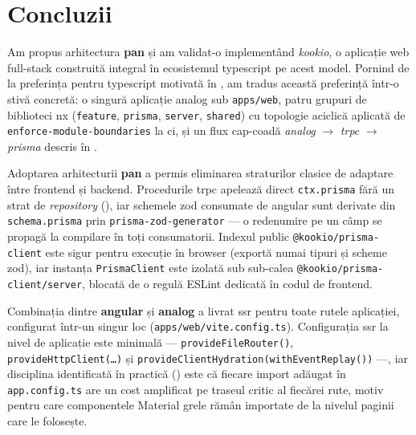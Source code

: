 \section{Concluzii}\label{cap:concluzii}

Am propus arhitectura \textbf{\gls{pan}} și am validat-o implementând \textit{\gls{kookio}}, o aplicație \gls{web} full-stack construită integral în ecosistemul \gls{typescript} pe acest model.
Pornind de la preferința pentru \gls{typescript} motivată în , am tradus această preferință într-o stivă concretă: o singură aplicație \gls{analog} sub \texttt{apps/web}, patru grupuri de biblioteci \gls{nx} (\texttt{feature}, \texttt{prisma}, \texttt{server}, \texttt{shared}) cu topologie aciclică aplicată de \texttt{enforce-module-boundaries} la \acrshort{ci}, și un flux cap-coadă \textit{\gls{analog}} \(\rightarrow\) \textit{\acrshort{trpc}} \(\rightarrow\) \textit{\gls{prisma}} descris în .

Adoptarea arhitecturii \textbf{\gls{pan}} a permis eliminarea straturilor clasice de adaptare între frontend și backend.
Procedurile \acrshort{trpc} apelează direct \texttt{ctx.prisma} fără un strat de \textit{repository} (), iar schemele \gls{zod} consumate de \gls{angular} sunt derivate din \texttt{schema.prisma} prin \texttt{prisma-zod-generator} --- o redenumire pe un câmp se propagă la compilare în toți consumatorii.
Indexul public \texttt{@kookio/prisma-client} este sigur pentru execuție în browser (exportă numai tipuri și scheme \gls{zod}), iar instanța \texttt{PrismaClient} este izolată sub sub-calea \texttt{@kookio/prisma-client/server}, blocată de o regulă ESLint dedicată în codul de frontend.

Combinația dintre \textbf{\gls{angular}} și \textbf{\gls{analog}} a livrat \acrshort{ssr} pentru toate rutele aplicației, configurat într-un singur loc (\texttt{apps/web/vite.config.ts}).
Configurația \acrshort{ssr} la nivel de aplicație este minimală --- \texttt{provideFileRouter()}, \texttt{provideHttpClient(\ldots)} și \texttt{provideClientHydration(\allowbreak withEventReplay())} ---, iar disciplina identificată în practică () este că fiecare import adăugat în \texttt{app.config.ts} are un cost amplificat pe traseul critic al fiecărei rute, motiv pentru care componentele Material grele rămân importate de la nivelul paginii care le folosește.


